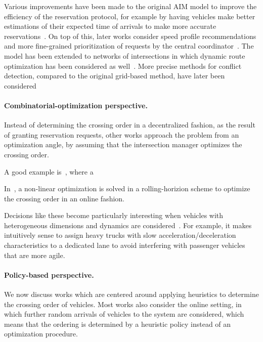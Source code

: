 \documentclass[a4paper]{report}
\theoremstyle{definition}
\theoremstyle{plain}
\begin{document}
Various improvements have been made to the original AIM model to improve the
efficiency of the reservation protocol, for example by having vehicles make
better estimations of their expected time of arrivals to make more accurate
reservations~\cite{auMotionPlanningAlgorithms2010}.
%
On top of this, later works consider speed profile recommendations and more
fine-grained prioritization of requests by the central
coordinator~\cite{huangAssessingMobilityEnvironmental2012}.
%
The model has been extended to networks of intersections in which dynamic route
optimization has been considered as well~\cite{hausknechtAutonomousIntersectionManagement2011}.
%
More precise methods for conflict detection, compared to the original grid-based
method, have later been considered
~\cite{levinConflictpointFormulationIntersection2017,liTemporalspatialDimensionExtensionbased2019}


\paragraph{Combinatorial-optimization perspective.}

Instead of determining the crossing order in a decentralized fashion, as the
result of granting reservation requests, other works approach the problem from
an optimization angle, by assuming that the intersection manager optimizes the
crossing order.

A good example is~\cite{levinConflictpointFormulationIntersection2017}, where a

In~\cite{liTemporalspatialDimensionExtensionbased2019}, a non-linear
optimization is solved in a rolling-horizion scheme to optimize the crossing
order in an online fashion.

Decisions like these become particularly interesting when vehicles with
heterogeneous dimensions and dynamics are
considered~\cite{joshiTrajectoriesPlatoonformingAlgorithm2025}. For example, it
makes intuitively sense to assign heavy trucks with slow
acceleration/deceleration characteristics to a dedicated lane to avoid
interfering with passenger vehicles that are more agile.


\paragraph{Policy-based perspective.}

We now discuss works which are centered around applying heuristics to determine
the crossing order of vehicles. Most works also consider the online setting, in
which further random arrivals of vehicles to the system are considered, which
means that the ordering is determined by a heuristic policy instead of an
optimization procedure.
\end{document}
